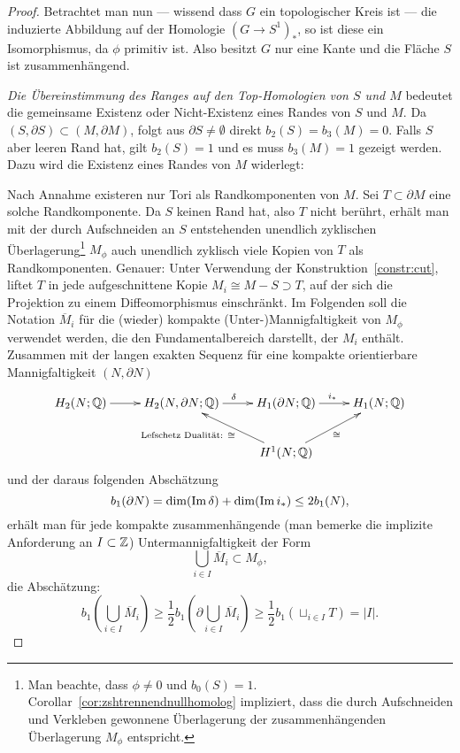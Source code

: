 \begin{proof}
	 Betrachtet man nun --- wissend dass $G$ ein topologischer Kreis ist --- die induzierte Abbildung auf der Homologie $(G\to S^1)_*$, so ist diese ein Isomorphismus, da $\phi$ primitiv ist. Also besitzt $G$ nur eine Kante und die Fläche $S$ ist zusammenhängend.

	 \emph{Die Übereinstimmung des Ranges auf den Top-Homologien von $S$ und $M$} bedeutet die gemeinsame Existenz oder Nicht-Existenz eines Randes von $S$ und $M$. Da $(S,\partial S) \subset (M,\partial M)$, folgt aus $\partial S \neq \emptyset$ direkt $b_2(S)=b_3(M)=0$. Falls $S$ aber leeren Rand hat, gilt $b_2(S)=1$ und es muss $b_3(M)=1$ gezeigt werden. Dazu wird die Existenz eines Randes von $M$ widerlegt:

	 Nach Annahme existeren nur Tori als Randkomponenten von $M$. Sei $T \subset \partial M$ eine solche Randkomponente. Da $S$ keinen Rand hat, also $T$ nicht berührt, erhält man mit der durch Aufschneiden an $S$ entstehenden unendlich zyklischen Überlagerung\footnote{Man beachte, dass $\phi \neq 0$ und $b_0(S)=1$. Corollar~\ref{cor:zshtrennendnullhomolog} impliziert, dass die durch Aufschneiden und Verkleben gewonnene Überlagerung der zusammenhängenden Überlagerung $M_\phi$ entspricht.} $M_\phi$ auch unendlich zyklisch viele Kopien von $T$ als Randkomponenten. Genauer: Unter Verwendung der Konstruktion~\ref{constr:cut}, liftet $T$ in jede aufgeschnittene Kopie $M_i \cong M - S \supset T$, auf der sich die Projektion zu einem Diffeomorphismus einschränkt. Im Folgenden soll die Notation $\overline M_i$ für die (wieder) kompakte (Unter-)Mannigfaltigkeit von $M_\phi$ verwendet werden, die den Fundamentalbereich darstellt, der $M_i$ enthält. Zusammen mit der langen exakten Sequenz für eine kompakte orientierbare Mannigfaltigkeit $(N,\partial N)$
	\[
	 \begin{xy}
	 	\xymatrix{
	 	H_2(N;\QQ) \ar[r]&  H_2(N,\partial N ; \QQ) \ar[r]^\delta & H_1(\partial N;\QQ) \ar[r]^{i_*}& H_1(N;\QQ) \\
	 	& &H^1(N;\QQ) \ar[ru]_{\cong} \ar[lu]^{\text{Lefschetz Dualität: }\cong \qquad~}&}
	 \end{xy}
	 \] 
	 und der daraus folgenden Abschätzung
	 \[
	 	b_1(\partial N) = \dim(\operatorname{Im} \delta) + \dim(\operatorname{Im} i_*) \leq  2b_1(N),
	 \]
	 erhält man für jede kompakte zusammenhängende (man bemerke die implizite Anforderung an $I\subset \mathbb{Z}$) Untermannigfaltigkeit der Form 
	 \[
	  	\bigcup_{i\in I} \overline M_i \subset M_\phi ,
	  \]
	  die Abschätzung:
	  \[
	   	b_1(\bigcup_{i\in I} \overline M_i)\geq \frac{1}{2}b_1(\partial \bigcup_{i\in I} \overline M_i) \geq \frac{1}{2}b_1(\sqcup_{i \in I}T) = |I|.
	  \]



\end{proof}
